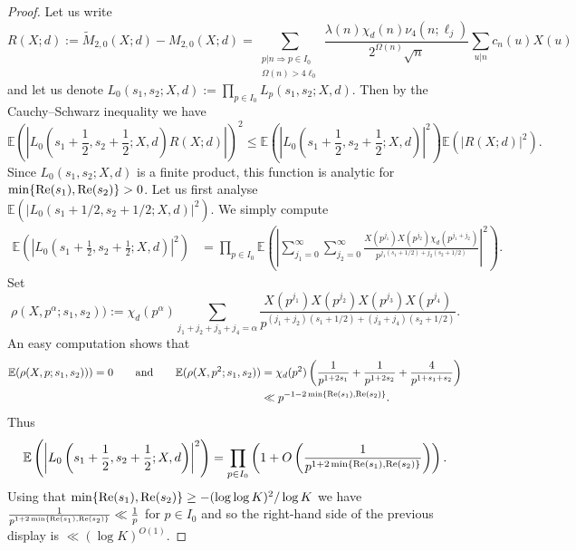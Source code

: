 \documentclass[a4paper,10pt,twoside]{amsart}
\theoremstyle{definition}
\numberwithin{equation}{section}
\renewcommand{\Re}{\textnormal{Re}}
\renewcommand\:{\colon}
\begin{document}
\begin{proof}
Let us write
\[ 
R(X;d):=\widetilde M_{2,0}(X;d)-M_{2,0}(X;d)=\sum_{\substack{p|n\Rightarrow p\in I_0\\
\Omega(n)>4\ell_0}}\frac{\lambda(n)\chi_d(n)\nu_4(n;\ell_j)}{2^{\Omega(n)}\sqrt n}\sum_{u|n}c_n(u)X(u)
\]
and let us denote $L_0(s_1,s_2;X,d):=\prod_{p\in I_0}L_p(s_1,s_2;X,d)$. Then by the Cauchy--Schwarz inequality we have
\[ 
\mathbb E\left(\left|L_0\left(s_1+\frac12,s_2+\frac12;X,d\right)R(X;d)\right|\right)^2\leq\mathbb E\left(\left|L_0\left(s_1+\frac12,s_2+\frac12;X,d\right)\right|^2\right)\mathbb E\left(|R(X;d)|^2\right).
\]
Since $L_0(s_1,s_2;X,d)$ is a finite product, this function is analytic for $\min\{\Re(s_1),\Re(s_2)\}>0$. Let us first analyse $\mathbb E(|L_0(s_1+1/2,s_2+1/2;X,d)|^2)$. We simply compute
\begin{align*}
\mathbb E\left(\left|L_0\left(s_1+\frac12,s_2+\frac12;X,d\right)\right|^2\right)&=\prod_{p\in I_0}\mathbb E\left(\left|\sum_{j_1=0}^\infty\sum_{j_2=0}^\infty\frac{X(p^{j_1})X(p^{j_2})\chi_d(p^{j_1+j_2})}{p^{j_1(s_1+1/2)+j_2(s_2+1/2)}}\right|^2\right).
\end{align*}
Set 
\[ 
\rho(X,p^\alpha;s_1,s_2)):=\chi_d(p^\alpha)\sum_{j_1+j_2+j_3+j_4=\alpha}\frac{X(p^{j_1})X(p^{j_2})X(p^{j_3})X(p^{j_4})}{p^{(j_1+j_2)(s_1+1/2)+(j_3+j_4)(s_2+1/2)}}.
\]
An easy computation shows that 
\begin{align*}
\mathbb E(\rho(X,p;s_1,s_2)))=0 \qquad \text{and} \qquad \mathbb E(\rho(X,p^2;s_1,s_2))&=\chi_d(p^2)\left(\frac1{p^{1+2s_1}}+\frac1{p^{1+2s_2}}+\frac4{p^{1+s_1+s_2}}\right)\\
&\ll p^{-1-2\min\{\Re(s_1),\Re(s_2)\}}.
\end{align*}
Thus 
\[ 
\mathbb E\left(\left|L_0\left(s_1+\frac12,s_2+\frac12;X,d\right)\right|^2\right)=\prod_{p\in I_0}\left(1+O\left(\frac1{p^{1+2\min\{\Re(s_1),\Re(s_2)\}}}\right)\right).
\]
Using that $\min\{\Re(s_1),\Re(s_2)\}\geq -(\log\log K)^2/\log K$ we have $\frac1{p^{1+2\min\{\Re(s_1),\Re(s_2)\}}}\ll\frac1p$ for $p\in I_0$ and so the right-hand side of the previous display is $\ll (\log K)^{O(1)}$.


\end{proof}
\end{document}
